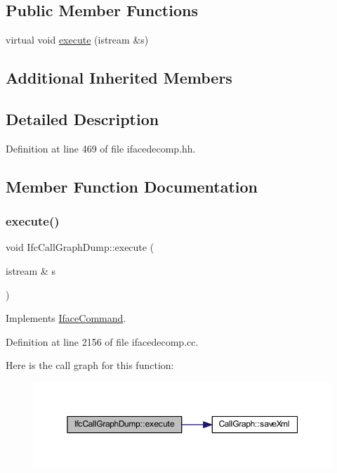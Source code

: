 \subsection*{Public Member Functions}
\begin{DoxyCompactItemize}
\item 
virtual void \mbox{\hyperlink{class_ifc_call_graph_dump_aa64392bb204496b5aceaa74f0338871a}{execute}} (istream \&s)
\end{DoxyCompactItemize}
\subsection*{Additional Inherited Members}


\subsection{Detailed Description}


Definition at line 469 of file ifacedecomp.\+hh.



\subsection{Member Function Documentation}
\mbox{\label{class_ifc_call_graph_dump_aa64392bb204496b5aceaa74f0338871a}} 
\subsubsection{\texorpdfstring{execute()}{execute()}}
{\footnotesize\ttfamily void Ifc\+Call\+Graph\+Dump\+::execute (\begin{DoxyParamCaption}\item[{istream \&}]{s }\end{DoxyParamCaption})\hspace{0.3cm}{\ttfamily [virtual]}}



Implements \mbox{\hyperlink{class_iface_command_af10e29cee2c8e419de6efe9e680ad201}{Iface\+Command}}.



Definition at line 2156 of file ifacedecomp.\+cc.

Here is the call graph for this function\+:
\nopagebreak
\begin{figure}[H]
\begin{center}
\leavevmode
\includegraphics[width=350pt]{class_ifc_call_graph_dump_aa64392bb204496b5aceaa74f0338871a_cgraph}
\end{center}
\end{figure}


